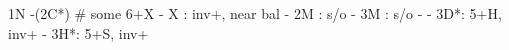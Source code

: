 1N -(2C*) # some 6+X
        - X  : inv+, near bal
        - 2M : s/o
             - 3M : s/o
        - 
        - 3D*: 5+H, inv+
        - 3H*: 5+S, inv+
